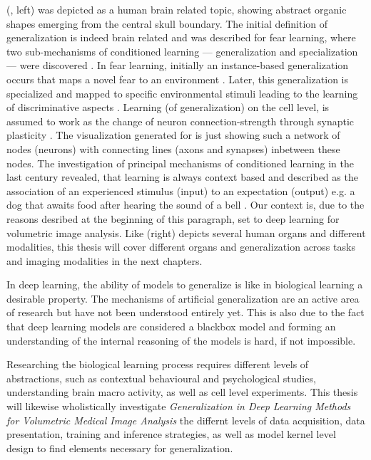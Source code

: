      (, left) was depicted as a human brain related topic, showing abstract organic shapes emerging from the central skull boundary.
    The initial definition of generalization is indeed brain related and was described for fear learning, where two sub-mechanisms of conditioned learning --- generalization and specialization --- were discovered \citep{xx, banich2011generalization}. %
    In fear learning, initially an instance-based generalization occurs that maps a novel fear to an environment \citep{banich2011generalization}. Later, this generalization is specialized and mapped to specific environmental stimuli leading to the learning of discriminative aspects \citep{banich2011generalization}.
    Learning (of generalization) on the cell level, is assumed to work as the change of neuron connection-strength through synaptic plasticity \citep{do1949organization,martin2000synaptic}. The visualization generated for  is just showing such a network of nodes (neurons) with connecting lines (axons and synapses) inbetween these nodes.
    The investigation of principal mechanisms of conditioned learning in the last century revealed, that learning is always context based and described as the association of an experienced stimulus (input) to an expectation (output) e.g. a dog that awaits food after hearing the sound of a bell \citep{pavlov1928conditioned, pavlov2010conditioned, banich2011generalization}.
    Our context is, due to the reasons desribed at the beginning of this paragraph, set to deep learning for volumetric image analysis. Like   (right) depicts several human organs and different modalities, this thesis will cover different organs and generalization across tasks and imaging modalities in the next chapters. %

    In deep learning, the ability of models to generalize is like in biological learning a desirable property. The mechanisms of artificial generalization are an active area of research but have not been understood entirely yet. This is also due to the fact that deep learning models are considered a blackbox model and forming an understanding of the internal reasoning of the models is hard, if not impossible.

    Researching the biological learning process requires different levels of abstractions, such as contextual behavioural and psychological studies, understanding brain macro activity, as well as cell level experiments.
    This thesis will likewise wholistically investigate \emph{Generalization in Deep Learning Methods for Volumetric Medical Image Analysis} the  differnt levels of data acquisition, data presentation, training and inference strategies, as well as model kernel level design to find elements necessary for generalization.

